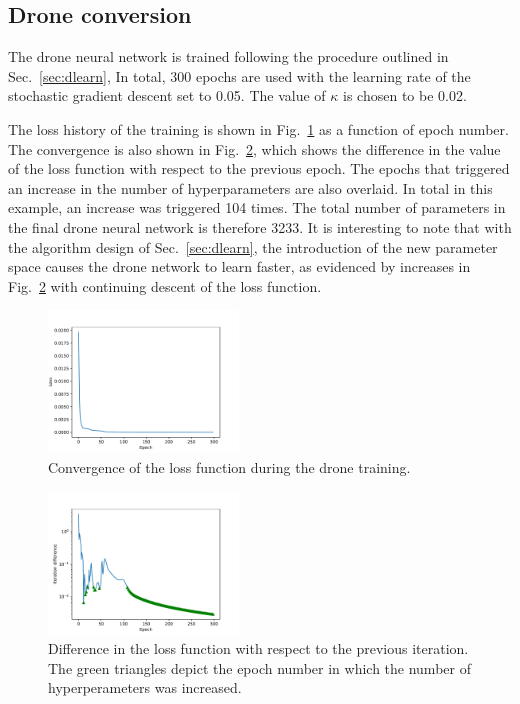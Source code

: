 \documentclass[final,5p,times,twocolumn]{elsarticle}
\begin{document}
\subsection{Drone conversion}

The drone neural network is trained following the procedure outlined in Sec.~\ref{sec:dlearn},
In total, 300 epochs are used with
the learning rate of the stochastic gradient descent set to 0.05.
The value of $\kappa$ is chosen to be 0.02.

The loss history of the training is shown in Fig.~\ref{fig:loss}
as a function of epoch number.
The convergence is also shown in Fig.~\ref{fig:iterdiff}, which shows
the difference in the value of the loss function with respect to the previous
epoch. The epochs that triggered an increase in the number of hyperparameters
are also overlaid.
In total in this example, an increase was triggered 104 times. The total number
of parameters in the final drone neural network is therefore 3233. It is interesting
to note that with the algorithm design of Sec.~\ref{sec:dlearn}, the introduction
of the new parameter space causes the drone network to learn faster, as evidenced by
increases in Fig.~\ref{fig:iterdiff} with continuing descent of the loss function.
\begin{figure}[t]
\centering
\includegraphics[width=0.45\textwidth]{loss_history.pdf}
\caption{\small 
Convergence of the loss function during the drone training.
}
\label{fig:loss}
\end{figure}
\begin{figure}[t]
\centering
\includegraphics[width=0.45\textwidth]{diff_history.pdf}
\caption{\small 
Difference in the loss function with respect to the previous iteration. The green triangles
depict the epoch number in which the number of hyperperameters was increased.
}
\label{fig:iterdiff}
\end{figure}
\end{document}
